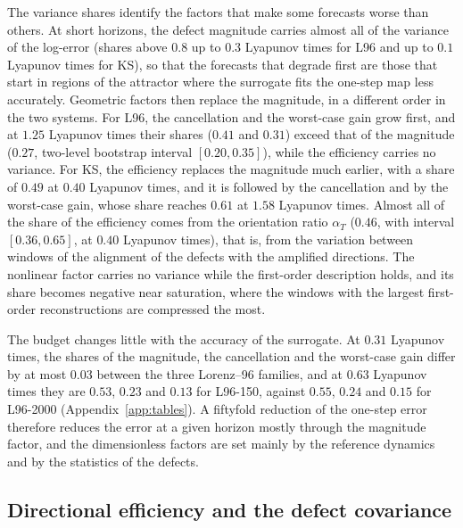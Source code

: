 The variance shares identify the factors that make some forecasts worse than others. At short horizons, the defect magnitude carries almost all of the variance of the log-error (shares above $0.8$ up to $0.3$ Lyapunov times for L96 and up to $0.1$ Lyapunov times for KS), so that the forecasts that degrade first are those that start in regions of the attractor where the surrogate fits the one-step map less accurately. Geometric factors then replace the magnitude, in a different order in the two systems. For L96, the cancellation and the worst-case gain grow first, and at $1.25$ Lyapunov times their shares ($0.41$ and $0.31$) exceed that of the magnitude ($0.27$, two-level bootstrap interval $[0.20,0.35]$), while the efficiency carries no variance. For KS, the efficiency replaces the magnitude much earlier, with a share of $0.49$ at $0.40$ Lyapunov times, and it is followed by the cancellation and by the worst-case gain, whose share reaches $0.61$ at $1.58$ Lyapunov times. Almost all of the share of the efficiency comes from the orientation ratio $\alpha_T$ ($0.46$, with interval $[0.36,0.65]$, at $0.40$ Lyapunov times), that is, from the variation between windows of the alignment of the defects with the amplified directions. The nonlinear factor carries no variance while the first-order description holds, and its share becomes negative near saturation, where the windows with the largest first-order reconstructions are compressed the most.

The budget changes little with the accuracy of the surrogate. At $0.31$ Lyapunov times, the shares of the magnitude, the cancellation and the worst-case gain differ by at most $0.03$ between the three Lorenz--96 families, and at $0.63$ Lyapunov times they are $0.53$, $0.23$ and $0.13$ for L96-150, against $0.55$, $0.24$ and $0.15$ for L96-2000 (Appendix~\ref{app:tables}). A fiftyfold reduction of the one-step error therefore reduces the error at a given horizon mostly through the magnitude factor, and the dimensionless factors are set mainly by the reference dynamics and by the statistics of the defects.

\subsection{Directional efficiency and the defect covariance}
\label{sec:res_efficiency}

